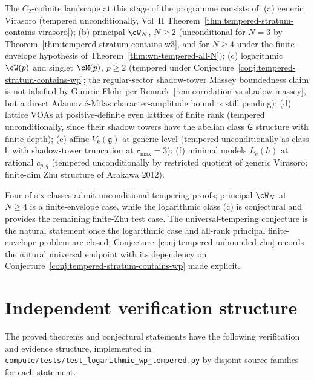 \begin{remark}
\label{rem:evidence-for-tempering-criterion}
The $C_2$-cofinite landscape at this stage of the programme consists
of: (a) generic Virasoro (tempered unconditionally, Vol~II
Theorem~\ref{thm:tempered-stratum-contains-virasoro}); (b) principal
$\cW_N$, $N \ge 2$ (unconditional for $N=3$ by
Theorem~\ref{thm:tempered-stratum-contains-w3}, and for
$N \ge 4$ under the finite-envelope hypothesis of
Theorem~\ref{thm:wn-tempered-all-N}); (c) logarithmic $\cW(p)$ and
singlet $\cM(p)$, $p \ge 2$ (tempered under
Conjecture~\ref{conj:tempered-stratum-contains-wp}; the regular-sector
shadow-tower Massey boundedness claim is not falsified by
Gurarie-Flohr per
Remark~\ref{rem:correlation-vs-shadow-massey}, but a direct
Adamovi\'c-Milas character-amplitude bound is still pending); (d)
lattice VOAs at positive-definite even lattices of finite rank
(tempered unconditionally, since their shadow towers have the
abelian class $\mathsf{G}$ structure with finite depth); (e) affine
$V_k(\mathfrak{g})$ at generic level (tempered unconditionally as
class $\mathsf{L}$ with shadow-tower truncation at $r_{\max} = 3$);
(f) minimal models $L_c(h)$ at rational $c_{p,q}$ (tempered
unconditionally by restricted quotient of generic Virasoro;
finite-dim Zhu structure of Arakawa 2012).

Four of six classes admit unconditional tempering proofs; principal
$\cW_N$ at $N\ge4$ is a finite-envelope case, while the logarithmic
class (c) is conjectural and provides the remaining finite-Zhu test
case. The universal-tempering conjecture is the natural statement once
the logarithmic case and all-rank principal finite-envelope problem are
closed;
Conjecture~\ref{conj:tempered-unbounded-zhu} records the natural
universal endpoint with its dependency on
Conjecture~\ref{conj:tempered-stratum-contains-wp} made explicit.
\end{remark}

\section{Independent verification structure}
\label{sec:wp-iv-summary}

The proved theorems and conjectural statements have the following
verification and evidence structure, implemented in
\texttt{compute/tests/test\_logarithmic\_wp\_tempered.py} by disjoint
source families for each statement.

